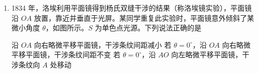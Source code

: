 \documentclass[\gkver]{gaokaozhenti}
\begin{document}
\begin{enumerate}
{解得 $v_{B} = \frac{B^{2}L^{2}d}{2mR} + \mu gt_{0}$

综上有 $v_{B} = \frac{v_{0}}{2} + \frac{\mu gt_{0}}{2} > \frac{v_{0}}{2}$

则金属杆经过 $BB_{1}$ 的速度大于 $\frac{v_{0}}{2}$，故 A 错误；

B．在整个过程中，根据能量守恒有 $\frac{1}{2}mv_{0}^{2} = \mu mgd + Q$

则在整个过程中，定值电阻 $R$ 产生的热量为 $Q_{R}=\frac{1}{2}Q=\frac{1}{4}mv_{0}^{2}-\frac{1}{2}\mu mgd$，故 B 错误；

C．金属杆经过 $AA_{1}B_{1}B$ 与 $BB_{1}C_{1}C$ 区域，金属杆所受安培力的冲量为 $-\sum BIL\Delta t=-\sum\frac{B^{2}L^{2}}{2R}v_{t}\Delta t=\frac{B^{2}L^{2}x}{2R}$

则金属杆经过 $AA_{1}B_{1}B$ 与 $BB_{1}C_{1}C$ 区域滑行距离均为 $d$，金属杆所受安培力的冲量相同，故 C 正确；

D．根据 A 选项可得，金属杆以初速度 $v_{0}$ 在磁场中运动有 $-\frac{B^{2}L^{2}\times2d}{2R}-\mu mgt_{0}=-mv_{0}$

金属杆的初速度加倍，则金属杆通过 $AA_{1}B_{1}B$ 区域时有 $-\frac{B^{2}L^{2}d}{2R}=mv_{B}^{\prime}-2mv_{0}$

则金属杆通过 $BB_{1}$ 时速度为 $v_{B}^{\prime}=2v_{0}-\frac{B^{2}L^{2}d}{2mR}$

设金属杆通过 $BB_{1}C_{1}C$ 区域的时间为 $t_{1}$，则 $-\frac{B^{2}L^{2}d}{2R}-\mu mgt_{1}=mv_{C}^{\prime}-mv_{B}^{\prime}$，$-\frac{B^{2}L^{2}x}{2R}-\mu mgt_{1}=0-2mv_{0}$

则 $x=\frac{2R}{B^{2}L^{2}}(2mv_{0}-\mu mgt_{1})=\frac{2mv_{0}-\mu mgt_{1}}{mv_{0}-\mu mgt_{0}}\times2d$

由于 $t<t_{0}$，则 $x>4d$

可见若将金属杆的初速度加倍，则金属杆在磁场中运动的距离大于原来的 2 倍，故 D 正确。

故选 CD。
}

\item
1834 年，洛埃利用平面镜得到杨氏双缝干涉的结果（称洛埃镜实验），平面镜沿 $OA$ 放置，靠近并垂直于光屏。某同学重复此实验时，平面镜意外倾斜了某微小角度 $\theta$，如图所示。$S$ 为单色点光源。下列说法正确的是


{沿 $OA$ 向右略微平移平面镜，干涉条纹间距减小}
{若 $\theta = 0^\circ$，沿 $OA$ 向右略微平移平面镜，干涉条纹间距不变}
{若 $\theta = 0^\circ$，沿 $AO$ 向左略微平移平面镜，干涉条纹向 $A$ 处移动}


\end{enumerate}
\end{document}
